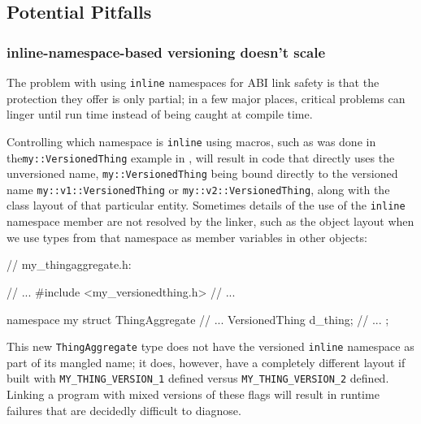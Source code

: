 \subsection[Potential Pitfalls]{Potential Pitfalls}\label{potential-pitfalls-inlinenamespace}

\subsubsection[\lstinline!nline!-namespace-based versioning doesn’t scale]{{\SubsubsecCode inline}-namespace-based versioning doesn’t scale}\label{inline-namespace-based-versioning-doesn’t-scale}

The problem with using \lstinline!inline! namespaces for ABI link safety is
that the protection they offer is only partial; in a few major places,
critical problems can linger until run time instead of being caught at
compile time.

Controlling which namespace is \lstinline!inline! using macros, such as was
done in the\linebreak[4] \lstinline!my::VersionedThing! example in ,  
will result in code that
directly uses the unversioned name, \lstinline!my::VersionedThing! being
bound directly to the versioned name \lstinline!my::v1::VersionedThing! or
\lstinline!my::v2::VersionedThing!, along with the class layout of that
particular entity. Sometimes details of the use of the \lstinline!inline!
namespace member are not resolved by the linker, such as the object
layout when we use types from that namespace as member variables in
other objects:

\begin{emcppslisting}[emcppsbatch=e7]
// my_thingaggregate.h:

// ...
#include <my_versionedthing.h>
// ...

namespace my
{
    struct ThingAggregate
    {
        // ...
        VersionedThing d_thing;
        // ...
    };
}
\end{emcppslisting}
    
\noindent This new \lstinline!ThingAggregate! type does not have the versioned
\lstinline!inline! namespace as part of its mangled name; it does, however,
have a completely different layout if built with
\lstinline!MY_THING_VERSION_1! defined
versus \lstinline!MY_THING_VERSION_2! defined. Linking a program with mixed
versions of these flags will result in runtime failures that are
decidedly difficult to diagnose.

